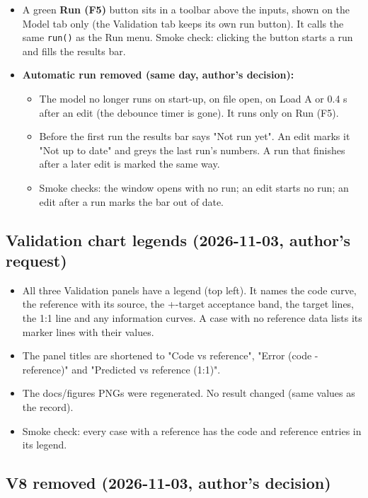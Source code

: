 \documentclass[10pt,a4paper]{article}
\begin{document}
\begin{itemize}
\item A green \textbf{Run (F5)} button sits in a toolbar above the inputs, shown on the Model tab only (the Validation tab keeps its own run button). It calls the same \texttt{run()} as the Run menu. Smoke check: clicking the button starts a run and fills the results bar.
\item \textbf{Automatic run removed (same day, author's decision):}
\begin{itemize}
\item The model no longer runs on start-up, on file open, on Load A or 0.4 s after an edit (the debounce timer is gone). It runs only on Run (F5).
\item Before the first run the results bar says "Not run yet". An edit marks it "Not up to date" and greys the last run's numbers. A run that finishes after a later edit is marked the same way.
\item Smoke checks: the window opens with no run; an edit starts no run; an edit after a run marks the bar out of date.
\end{itemize}
\end{itemize}

\subsection*{Validation chart legends (2026-11-03, author's request)}

\begin{itemize}
\item All three Validation panels have a legend (top left). It names the code curve, the reference with its source, the +-target acceptance band, the target lines, the 1:1 line and any information curves. A case with no reference data lists its marker lines with their values.
\item The panel titles are shortened to "Code vs reference", "Error (code - reference)" and "Predicted vs reference (1:1)".
\item The docs/figures PNGs were regenerated. No result changed (same values as the record).
\item Smoke check: every case with a reference has the code and reference entries in its legend.
\end{itemize}

\subsection*{V8 removed (2026-11-03, author's decision)}
\end{document}
